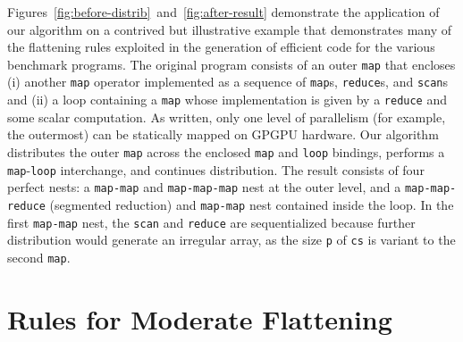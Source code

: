 Figures~\ref{fig:before-distrib}~and~\ref{fig:after-result}
demonstrate the application of our algorithm on a contrived but
illustrative example that demonstrates many of the flattening rules
exploited in the generation of efficient code for the various
benchmark programs.  The original program consists of an outer
\lstinline{map} that encloses (i) another \lstinline{map} operator
implemented as a sequence of \lstinline{map}s, \lstinline{reduce}s,
and \lstinline{scan}s and (ii) a loop containing a \lstinline{map}
whose implementation is given by a \lstinline{reduce} and some scalar
computation.  As written, only one level of parallelism (for example,
the outermost) can be statically mapped on GPGPU hardware. Our
algorithm distributes the outer \lstinline{map} across the enclosed
\lstinline{map} and \lstinline{loop} bindings, performs a
\lstinline{map}-\lstinline{loop} interchange, and continues
distribution.  The result consists of four perfect nests: a
\lstinline{map-map} and \lstinline{map-map-map} nest at the outer
level, and a \lstinline{map-map-reduce} (segmented reduction) and
\lstinline{map-map} nest contained inside the loop.  In the first
\lstinline{map-map} nest, the \lstinline{scan} and \lstinline{reduce}
are sequentialized because further distribution would generate an
irregular array, as the size \lstinline{p} of \lstinline{cs} is
variant to the second \lstinline{map}.

\section{Rules for Moderate Flattening}
\label{sec:moderate-flattening-rules}

